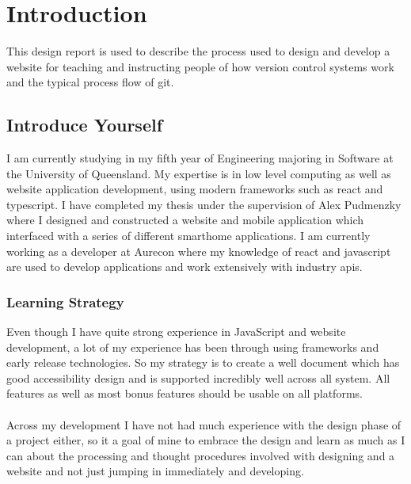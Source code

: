 
\section{Introduction}

This design report is used to describe the process used to design and develop a website for teaching and instructing people of how version control systems work and the typical process flow of \gls{git}.

\subsection{Introduce Yourself}
I am currently studying in my fifth year of Engineering majoring in Software at the University of Queensland. My expertise is in low level computing as well as website application development, using modern frameworks such as \gls{react} and \gls{typescript}. I have completed my thesis under the supervision of Alex Pudmenzky where I designed and constructed a website and mobile application which interfaced with a series of different \gls{smarthome} applications. I am currently working as a developer at Aurecon where my knowledge of \gls{react} and \gls{javascript} are used to develop applications and work extensively with industry \gls{api}s.

\subsubsection{Learning Strategy}
Even though I have quite strong experience in JavaScript and website development, a lot of my experience has been through using frameworks and early release technologies. So my strategy is to create a well document which has good accessibility design and is supported incredibly well across all system. All features as well as most bonus features should be usable on all platforms.\\\\
Across my development I have not had much experience with the design phase of a project either, so it a goal of mine to embrace the design and learn as much as I can about the processing and thought procedures involved with designing and a website and not just jumping in immediately and developing.